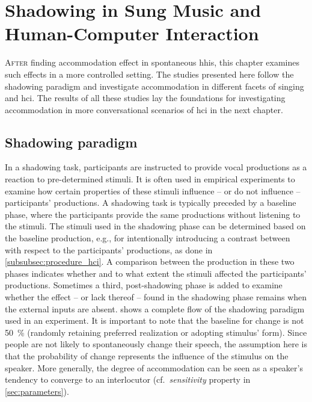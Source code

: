 \chapter{Shadowing in Sung Music and Human-Computer Interaction}
\label{chap:shadowing_in_sung_music_and_human_computer_interaction}

\lettrine{A}{fter} finding accommodation effect in spontaneous \aclp{hhi}, this chapter examines such effects in a more controlled setting.
The studies presented here follow the shadowing paradigm and investigate accommodation in different facets of singing and \acl{hci}.
The results of all these studies lay the foundations for investigating accommodation in more conversational scenarios of \acl{hci} in the next chapter.

\pagebreak

\section{Shadowing paradigm}
\label{sec:shadowing_paradigm}

In a shadowing task, participants are instructed to provide vocal productions as a reaction to pre-determined stimuli.
It is often used in empirical experiments \citep[e.g.,][]{Goldinger1998echoes} to examine how certain properties of these stimuli influence -- or do not influence -- participants' productions.
A shadowing task is typically preceded by a baseline phase, where the participants provide the same productions without listening to the stimuli.
The stimuli used in the shadowing phase can be determined based on the baseline production, e.g., for intentionally introducing a contrast between with respect to the participants' productions, as done in \cref{subsubsec:procedure_hci}.
A comparison between the production in these two phases indicates whether and to what extent the stimuli affected the participants' productions.
Sometimes a third, post-shadowing phase is added to examine whether the effect -- or lack thereof -- found in the shadowing phase remains when the external inputs are absent.
 shows a complete flow of the shadowing paradigm used in an experiment.
It is important to note that the baseline for change is not \SI{50}{\percent} (randomly retaining preferred realization or adopting stimulus' form).
Since people are not likely to spontaneously change their speech, the assumption here is that the probability of change represents the influence of the stimulus on the speaker.
More generally, the degree of accommodation can be seen as a speaker's tendency to converge to an interlocutor (cf.\ \emph{sensitivity} property in \cref{sec:parameters}).

